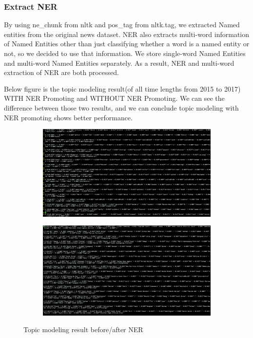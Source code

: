\subsubsection{Extract NER}
By using ne\_chunk from nltk and pos\_tag from nltk.tag, we extracted Named entities from the original news dataset. NER also extracts multi-word information of Named Entities other than just classifying whether a word is a named entity or not, so we decided to use that information. We store single-word Named Entities and multi-word Named Entities separately. As a result, NER and multi-word extraction of NER are both processed.

Below figure is the topic modeling result(of all time lengths from 2015 to 2017) WITH NER Promoting and WITHOUT NER Promoting. We can see the difference between those two results, and we can conclude topic modeling with NER promoting shows better performance.
\begin{figure}[t]
    \centering
    \begin{subfigure}[b]{0.4\textwidth}
        \includegraphics[width=\linewidth]{before_ner.png}
    \end{subfigure}
    \begin{subfigure}[b]{0.4\textwidth}
        \includegraphics[width=\linewidth]{after_ner.png}
    \end{subfigure}
	\caption{Topic modeling result before/after NER}
\end{figure}

